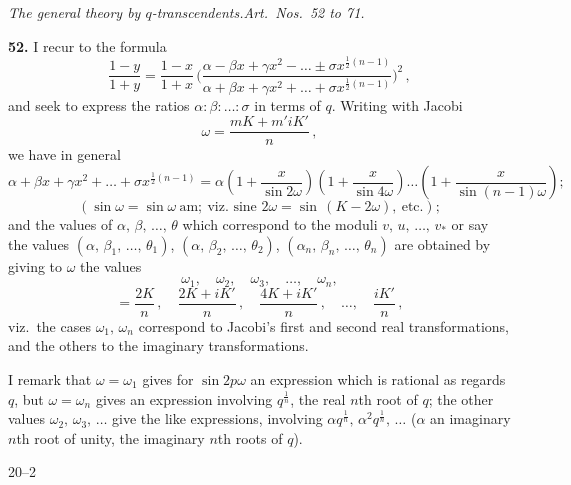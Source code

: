 \documentclass[11pt]{article}
\begin{document}
\bigskip

\noindent\textit{The general theory by $q$-transcendents.\quad Art.\ Nos.\ 52 to 71.}

\medskip

\textbf{52.} I recur to the formula
\[
\frac{1-y}{1+y} = \frac{1-x}{1+x}\,\biggl(\frac{\alpha-\beta x+\gamma x^2-\ldots\pm \sigma x^{\frac{1}{2}(n-1)}}{\alpha+\beta x+\gamma x^2+\ldots+\sigma x^{\frac{1}{2}(n-1)}}\biggr)^{\!2}\,,
\]
and seek to express the ratios $\alpha:\beta:\ldots:\sigma$ in terms of $q$. Writing with Jacobi
\[
\omega = \frac{mK + m'iK'}{n}\,,
\]
we have in general
\[
\alpha + \beta x + \gamma x^2 + \ldots + \sigma x^{\frac{1}{2}(n-1)} = \alpha\!\left(1+\frac{x}{\sin 2\omega}\right)\!\left(1+\frac{x}{\sin 4\omega}\right)\ldots\!\left(1+\frac{x}{\sin(n-1)\omega}\right);
\]
\[
(\sin\omega = \sin\omega\ \text{am};\ \text{viz.\ sine } 2\omega = \sin\,(K-2\omega),\ \text{etc.});
\]
and the values of $\alpha,\,\beta,\,\ldots,\,\theta$ which correspond to the moduli $v,\,u,\,\ldots,\,v_*$ or
say the values $(\alpha,\,\beta_1,\,\ldots,\,\theta_1)$, $(\alpha,\,\beta_2,\,\ldots,\,\theta_2)$, $(\alpha_n,\,\beta_n,\,\ldots,\,\theta_n)$
are obtained by giving to $\omega$ the values
\[
\omega_1,\quad \omega_2,\quad \omega_3,\quad \ldots,\quad \omega_n,
\]
\[
=\frac{2K}{n}\,,\quad \frac{2K + iK'}{n}\,,\quad \frac{4K + iK'}{n}\,,\quad \ldots,\quad \frac{iK'}{n}\,,
\]
viz.\ the cases $\omega_1,\,\omega_n$ correspond to Jacobi's first and second real transformations,
and the others to the imaginary transformations.

I remark that $\omega=\omega_1$ gives for $\sin 2p\omega$ an expression which is rational as
regards $q$, but $\omega=\omega_n$ gives an expression involving $q^{\frac{1}{n}}$, the real $n$th root of $q$;
the other values $\omega_2,\,\omega_3,\,\ldots$ give the like expressions, involving $\alpha q^{\frac{1}{n}},\,\alpha^2 q^{\frac{1}{n}},\,\ldots$
($\alpha$ an imaginary $n$th root of unity, the imaginary $n$th roots of $q$).

\bigskip

\hfill 20--2
\end{document}

